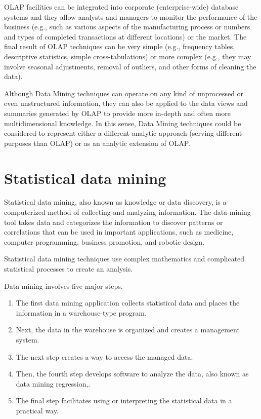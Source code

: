 \documentclass[11pt]{article} %
\begin{document}
OLAP facilities can be integrated into corporate (enterprise-wide) database systems and they allow analysts and managers to monitor the performance of the business (e.g., such as various aspects of the manufacturing process or numbers and types of completed transactions at different locations) or the market. The final result of OLAP techniques can be very simple (e.g., frequency tables, descriptive statistics, simple cross-tabulations) or more complex (e.g., they may involve seasonal adjustments, removal of outliers, and other forms of cleaning the data). 


Although Data Mining techniques can operate on any kind of unprocessed or even unstructured information, they can also be applied to the data views and summaries generated by OLAP to provide more in-depth and often more multidimensional knowledge. In this sense, Data Mining techniques could be considered to represent either a different analytic approach (serving different purposes than OLAP) or as an analytic extension of OLAP.




\section{Statistical data mining}


Statistical data mining, also known as knowledge or data discovery, is a computerized method of collecting and analyzing information. The data-mining tool takes data and categorizes the information to discover patterns or correlations that can be used in important applications, such as medicine, computer programming, business promotion, and robotic design. 


Statistical data mining techniques use complex mathematics and complicated statistical processes to create an analysis.


Data mining involves five major steps. 

\begin{enumerate}
\item The first data mining application collects statistical data and places the information in a warehouse-type program. 

\item Next, the data in the warehouse is organized and creates a management system. 

\item The next step creates a way to access the managed data. 

\item Then, the fourth step develops software to analyze the data, also known as data mining regression,. 

\item The final step facilitates using or interpreting the statistical data in a practical way.
\end{enumerate}
\end{document}
